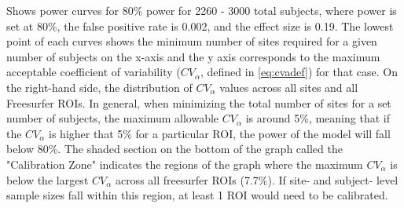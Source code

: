 \label{fig:cv_j} Shows power curves for 80\% power for 2260 - 3000 total subjects, where power is set at 80\%, the false positive rate is 0.002, and the effect size is 0.19. The lowest point of each curves shows the minimum number of sites required for a given number of subjects on the x-axis and the y axis corresponds to the maximum acceptable coefficient of variability ($CV_{\alpha}$, defined in \ref{eq:cvadef}) for that case. On the right-hand side, the distribution of $CV_{\alpha}$ values across all sites and all Freesurfer ROIs. In general, when minimizing the total number of sites for a set number of subjects, the maximum allowable $CV_{\alpha}$ is around 5\%, meaning that if the $CV_{\alpha}$ is higher that 5\% for a particular ROI, the power of the model will fall below 80\%. The shaded section on the bottom of the graph called the "Calibration Zone" indicates the regions of the graph where the maximum $CV_{\alpha}$ is below the largest $CV_{\alpha}$ across all freesurfer ROIs (7.7\%). If site- and subject- level sample sizes fall within this region, at least 1 ROI would need to be calibrated.